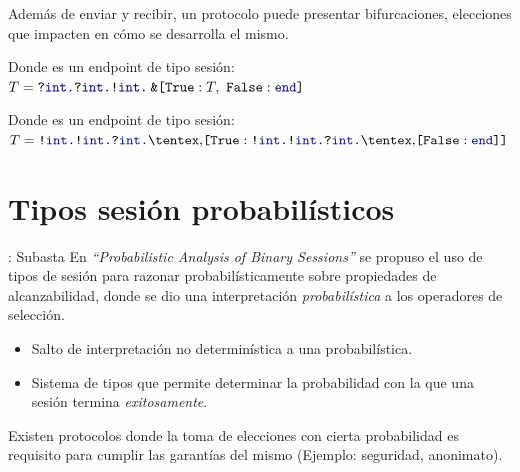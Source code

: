 \begin{frame}{\insertsubsection}
	Además de enviar y recibir, un protocolo puede presentar bifurcaciones,
	elecciones que impacten en cómo se desarrolla el mismo.

	\SumServerRec

	Donde  es un endpoint de tipo sesión: $\SessionType = \In\tint{ \In\tint{
		\Out\tint\BinaryPBranch[]\T\End } }$
\end{frame}

\begin{frame}{\insertsubsection}
	\SumThreeNumClient
	Donde  es un endpoint de tipo sesión: $\SessionType = \Out\tint{ \Out\tint{
		\In\tint{\Choice\set{\Tag[True]: \Out\tint{ \Out\tint{
		\In\tint{\Choice\set{\Tag[False]: \End} }}}} }}}$
\end{frame}

\section{Tipos sesión probabilísticos}

\begin{frame}{\insertsection: Subasta}
	En \emph{``Probabilistic Analysis of Binary Sessions''} se propuso el uso de tipos de sesión
	para razonar probabilísticamente sobre propiedades de alcanzabilidad,
	donde se dio una interpretación \emph{probabilística} a los operadores
	de selección.

	\begin{itemize}
		\item Salto de interpretación no determinística a una
		probabilística.
		\item Sistema de tipos que permite determinar la probabilidad con la que una
			sesión termina \emph{exitosamente}.
	\end{itemize}

	Existen protocolos donde la toma de elecciones con cierta probabilidad
	es requisito para cumplir las garantías del mismo (Ejemplo: seguridad, anonimato).
\end{frame}

